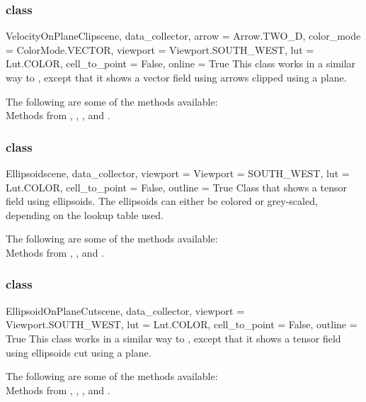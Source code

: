 \subsubsection{\VelocityOnPlaneClip class}

\begin{classdesc}{VelocityOnPlaneClip}{scene, data_collector, 
arrow = Arrow.TWO_D, color_mode = ColorMode.VECTOR, 
viewport = Viewport.SOUTH_WEST, lut = Lut.COLOR, 
cell_to_point = False, online = True}
This class works in a similar way to \MapOnPlaneClip, except that it shows a 
vector field using arrows clipped using a plane. 
\end{classdesc}

The following are some of the methods available:\\
Methods from \ActorThreeD, \GlyphThreeD, \Transform, \Clipper and 
\MaskPoints. 

\subsubsection{\Ellipsoid class}

\begin{classdesc}{Ellipsoid}{scene, data_collector, 
viewport = Viewport = SOUTH_WEST, lut = Lut.COLOR, cell_to_point = False,
outline = True}
Class that shows a tensor field using ellipsoids. The ellipsoids can either be 
colored or grey-scaled, depending on the lookup table used. 
\end{classdesc}

The following are some of the methods available:\\
Methods from \ActorThreeD, \Sphere, \TensorGlyph and \MaskPoints.

\subsubsection{\EllipsoidOnPlaneCut class}

\begin{classdesc}{EllipsoidOnPlaneCut}{scene, data_collector,
viewport = Viewport.SOUTH_WEST, lut = Lut.COLOR, cell_to_point = False,
outline = True}
This class works in a similar way to \MapOnPlaneCut, except that it shows
a tensor field using ellipsoids cut using a plane.
\end{classdesc}

The following are some of the methods available:\\
Methods from \ActorThreeD, \Sphere, \TensorGlyph, \Transform and 
\MaskPoints.

